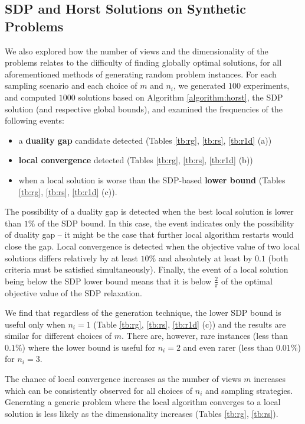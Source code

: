 \subsection{SDP and Horst Solutions on Synthetic Problems}\label{chap:experiments:horst}

We also explored how the number of views and the dimensionality of
the problems relates to the difficulty of finding globally optimal
solutions, for all aforementioned methods of generating random problem
instances.
 For each sampling scenario and each choice of $m$ and $n_i$, we generated $100$
experiments, and computed $1000$ solutions based on Algorithm
\ref{algorithm:horst}, the SDP solution (and respective
global bounds), and examined the frequencies of the following
events:
\begin{itemize}
\item a \textbf{duality gap} candidate detected (Tables
\ref{tb:rg}, \ref{tb:rs}, \ref{tb:r1d} (a))
\item \textbf{local convergence} detected (Tables \ref{tb:rg}, \ref{tb:rs},
\ref{tb:r1d} (b))
\item when a local solution is worse
than the SDP-based \textbf{lower bound} (Tables \ref{tb:rg},
\ref{tb:rs}, \ref{tb:r1d} (c)).
\end{itemize}
The possibility of a duality gap is
detected when the best local solution is lower than $1\%$ of the
SDP bound. In this case, the event indicates only the possibility
of duality gap -- it might be the case that further local
algorithm restarts would close the gap. Local convergence
is detected when the objective value of two local solutions
differs relatively by at least $10\%$ and absolutely at least by
$0.1$ (both criteria must be satisfied
simultaneously). Finally, the event of a local solution being
below the SDP lower bound means that it is below
$\frac{2}{\pi}$ of the optimal objective value of the SDP
relaxation.

We find that regardless of the generation technique, the lower
SDP bound is useful only when $n_i = 1$ (Table \ref{tb:rg},
\ref{tb:rs}, \ref{tb:r1d} (c)) and the results are similar for
different choices of $m$. There are, however, rare instances (less
than $0.1\%$) where the lower bound is useful for $n_i = 2$ and
even rarer (less than $0.01\%$) for $n_i = 3$.

The chance of local convergence increases as the number of views
$m$ increases which can be consistently observed for all choices
of $n_i$ and sampling strategies. Generating a generic problem where the
local algorithm  converges to a local solution is less
likely as the dimensionality increases
(Tables \ref{tb:rg}, \ref{tb:rs}).

